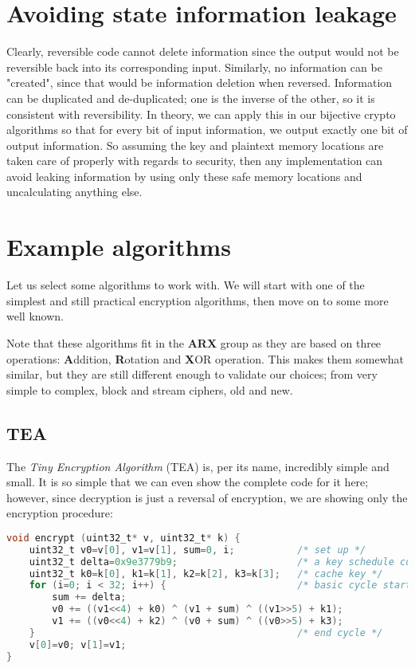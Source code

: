 \documentclass[a4paper,10pt,openright]{memoir}
\newcommand{\term}[1]{\textit{#1}}
\begin{document}
\section{Avoiding state information leakage}

Clearly, reversible code cannot delete information since the output 
would not be reversible back into its corresponding input. Similarly, 
no information can be "created", since that would be information 
deletion when reversed. Information can be duplicated and 
de-duplicated; one is the inverse of the other, so it is consistent 
with reversibility. In theory, we can apply this in our bijective 
crypto algorithms so that for every bit of input information, we output 
exactly one bit of output information. So assuming the key and 
plaintext memory locations are taken care of properly with regards to 
security, then any implementation can avoid leaking information by 
using only these safe memory locations and uncalculating anything else.

\section{Example algorithms}

Let us select some algorithms to work with. We will start with one of 
the simplest and still practical encryption algorithms, then move on to 
some more well known.

Note that these algorithms fit in the \textbf{ARX} group as they are 
based on three operations: \textbf{A}ddition, \textbf{R}otation and 
\textbf{X}OR operation. This makes them somewhat similar, but they are 
still different enough to validate our choices; from very simple to 
complex, block and stream ciphers, old and new. 

\subsection{TEA}

The \term{Tiny Encryption Algorithm} (TEA)\cite{tea95} is, per its 
name, incredibly simple and small. It is so simple that we can even 
show the complete code for it here; however, since decryption is just a 
reversal of encryption, we are showing only the encryption procedure:

\begin{lstlisting}[language=C]
void encrypt (uint32_t* v, uint32_t* k) {
    uint32_t v0=v[0], v1=v[1], sum=0, i;           /* set up */
    uint32_t delta=0x9e3779b9;                     /* a key schedule constant */
    uint32_t k0=k[0], k1=k[1], k2=k[2], k3=k[3];   /* cache key */
    for (i=0; i < 32; i++) {                       /* basic cycle start */
        sum += delta;
        v0 += ((v1<<4) + k0) ^ (v1 + sum) ^ ((v1>>5) + k1);
        v1 += ((v0<<4) + k2) ^ (v0 + sum) ^ ((v0>>5) + k3);
    }                                              /* end cycle */
    v[0]=v0; v[1]=v1;
}
\end{lstlisting}
\end{document}
